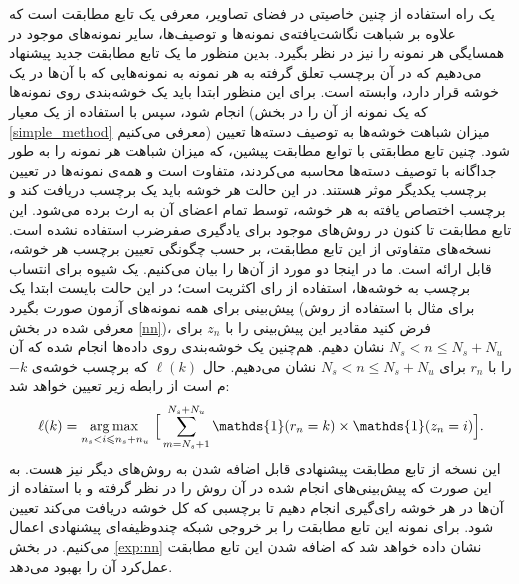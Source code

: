 یک راه استفاده از چنین خاصیتی در فضای تصاویر، معرفی یک تابع مطابقت است که علاوه بر شباهت نگاشت‌یافته‌ی نمونه‌ها و توصیف‌ها، سایر نمونه‌های موجود در همسایگی هر نمونه را نیز در نظر بگیرد. بدین منظور ما یک تابع مطابقت جدید پیشنهاد می‌دهیم که در آن برچسب تعلق گرفته به هر نمونه به نمونه‌هایی
 که با آن‌ها در یک خوشه قرار دارد، وابسته است. برای این منظور ابتدا باید یک خوشه‌بندی روی نمونه‌ها انجام شود، سپس با استفاده از یک معیار (که یک نمونه از آن را در بخش \ref{simple_method} معرفی می‌کنیم) میزان شباهت خوشه‌ها به توصیف دسته‌ها تعیین شود. چنین تابع مطابقتی با توابع مطابقت پیشین، که میزان شباهت هر نمونه را به طور جداگانه با توصیف دسته‌ها محاسبه می‌کردند، متفاوت است و همه‌ی نمونه‌ها در تعیین برچسب یکدیگر موثر هستند. در این حالت هر خوشه باید یک برچسب دریافت کند و برچسب اختصاص یافته به هر خوشه، توسط تمام اعضای آن به ارث برده می‌شود. این تابع مطابقت تا کنون در روش‌های موجود برای یادگیری صفرضرب استفاده نشده است. نسخه‌های متفاوتی از این تابع مطابقت، بر حسب چگونگی تعیین برچسب هر خوشه، قابل ارائه است. ما در اینجا دو مورد از آن‌ها را بیان می‌کنیم.
یک شیوه برای انتساب برچسب به  خوشه‌ها، استفاده از رای اکثریت است؛ در این حالت بایست ابتدا یک پیش‌بینی برای همه نمونه‌های آزمون صورت بگیرد (برای مثال با استفاده از روش معرفی شده در بخش \ref{nn})، فرض کنید مقادیر این پیش‌بینی را با
$z_n$
برای
 $N_s < n \leq N_s + N_u$
نشان دهیم. هم‌چنین یک خوشه‌بندی روی داده‌ها انجام شده که آن را با
$r_n$ برای
$N_s < n \leq N_s + N_u$
نشان می‌دهیم. حال   $\ell(k)$ که برچسب خوشه‌ی $-k$م است از رابطه زیر تعیین خواهد شد:
\begin{equation}
\label{eq:voting}
\ell(k) = \argmax_{n_s < i \leq n_s + n_u} \, \Big [ \sum_{m=N_s+1}^{N_s+N_u} \mathds{1}(r_n = k) \times \mathds{1}(z_n = i) \Big ].
\end{equation}
 این نسخه از تابع مطابقت پیشنهادی قابل اضافه شدن به روش‌های دیگر نیز هست. به این صورت که پیش‌بینی‌های انجام شده در آن روش را در نظر گرفته و با استفاده از آن‌ها در هر خوشه رای‌گیری انجام دهیم تا برچسبی که کل خوشه دریافت می‌کند تعیین شود. برای نمونه این تابع مطابقت را بر خروجی شبکه چندوظیفه‌ای پیشنهادی اعمال می‌کنیم. در بخش 
 \ref{exp:nn}
 نشان داده خواهد شد
  که  اضافه شدن این تابع مطابقت عمل‌کرد آن‌ را بهبود می‌دهد.


